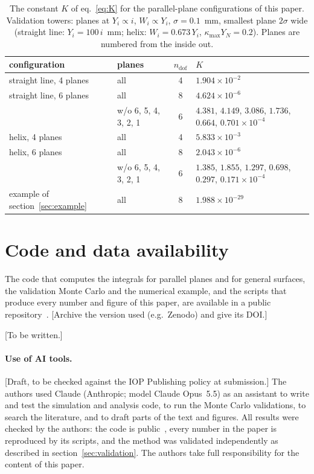 \IfFileExists{jinst.cls}{\documentclass[a4paper,11pt]{jinst}}
\newcommand{\ndof}{n_\mathrm{dof}}
\newcommand{\todo}[1]{\textcolor{red!70!black}{[#1]}}
\begin{document}
\begin{table}[htbp]
  \centering
  \caption{The constant $K$ of eq.~\eqref{eq:K} for the parallel-plane configurations of this paper.
  Validation towers: planes at $Y_i\propto i$, $W_i\propto Y_i$, $\sigma=0.1$~mm, smallest plane
  $2\sigma$ wide (straight line: $Y_i=100\,i$~mm; helix: $W_i=0.673\,Y_i$, $\kappa_\mathrm{max}Y_N=0.2$).
  Planes are numbered from the inside out.}
  \label{tab:K}
  \small
  \begin{tabular}{llcl}
    \toprule
    configuration & planes & $\ndof$ & $K$ \\
    \midrule
    straight line, 4 planes & all & 4 & $1.904\times10^{-2}$ \\
    straight line, 6 planes & all & 8 & $4.624\times10^{-6}$ \\
                            & w/o 6, 5, 4, 3, 2, 1 & 6 & $4.381$, $4.149$, $3.086$, $1.736$, $0.664$, $0.701\times10^{-4}$ \\
    helix, 4 planes         & all & 4 & $5.833\times10^{-3}$ \\
    helix, 6 planes         & all & 8 & $2.043\times10^{-6}$ \\
                            & w/o 6, 5, 4, 3, 2, 1 & 6 & $1.385$, $1.855$, $1.297$, $0.698$, $0.297$, $0.171\times10^{-4}$ \\
    example of section~\ref{sec:example} & all & 8 & $1.988\times10^{-29}$ \\
    \bottomrule
  \end{tabular}
\end{table}

\section{Code and data availability}\label{app:code}

The code that computes the integrals for parallel planes and for general surfaces, the validation
Monte Carlo and the numerical example, and the scripts that produce every number and figure of this
paper, are available in a public repository~\cite{code}. \todo{Archive the version used (e.g.\
Zenodo) and give its DOI.}

\acknowledgments
\todo{To be written.}

\paragraph{Use of AI tools.}
\todo{Draft, to be checked against the IOP Publishing policy at submission.} The authors used
Claude (Anthropic; model Claude Opus~5.5) as an assistant to write and test the simulation and
analysis code, to run the Monte Carlo validations, to search the literature, and to draft parts of
the text and figures. All results were checked by the authors: the code is public~\cite{code},
every number in the paper is reproduced by its scripts, and the method was validated independently
as described in section~\ref{sec:validation}. The authors take full responsibility for the content
of this paper.

\IfFileExists{JHEP.bst}{}{}

\end{document}

